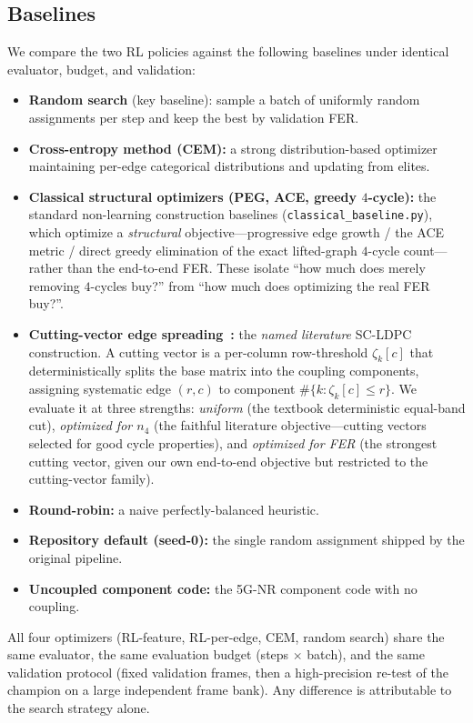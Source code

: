 \documentclass[journal]{IEEEtran}
\begin{document}
\subsection{Baselines}
We compare the two RL policies against the following baselines under identical
evaluator, budget, and validation:
\begin{itemize}
\item \textbf{Random search} (key baseline): sample a batch of uniformly random
assignments per step and keep the best by validation FER.
\item \textbf{Cross-entropy method (CEM):} a strong distribution-based optimizer
maintaining per-edge categorical distributions and updating from elites.
\item \textbf{Classical structural optimizers (PEG, ACE, greedy $4$-cycle):} the
standard non-learning construction baselines (\texttt{classical\_baseline.py}),
which optimize a \emph{structural} objective---progressive edge growth / the ACE
metric / direct greedy elimination of the exact lifted-graph $4$-cycle
count---rather than the end-to-end FER. These isolate ``how much does merely
removing $4$-cycles buy?'' from ``how much does optimizing the real FER buy?''.
\item \textbf{Cutting-vector edge spreading~\cite{mitchell2015scldpc}:} the
\emph{named literature} SC-LDPC construction. A cutting vector is a per-column
row-threshold $\zeta_k[c]$ that deterministically splits the base matrix into the
coupling components, assigning systematic edge $(r,c)$ to component
$\#\{k:\zeta_k[c]\le r\}$. We evaluate it at three strengths: \emph{uniform} (the
textbook deterministic equal-band cut), \emph{optimized for $n_4$} (the faithful
literature objective---cutting vectors selected for good cycle properties), and
\emph{optimized for FER} (the strongest cutting vector, given our own end-to-end
objective but restricted to the cutting-vector family).
\item \textbf{Round-robin:} a naive perfectly-balanced heuristic.
\item \textbf{Repository default (seed-0):} the single random assignment shipped
by the original pipeline.
\item \textbf{Uncoupled component code:} the 5G-NR component code with no
coupling.
\end{itemize}
All four optimizers (RL-feature, RL-per-edge, CEM, random search) share the same
evaluator, the same evaluation budget (steps $\times$ batch), and the same
validation protocol (fixed validation frames, then a high-precision re-test of
the champion on a large independent frame bank). Any difference is attributable
to the search strategy alone.
\end{document}
